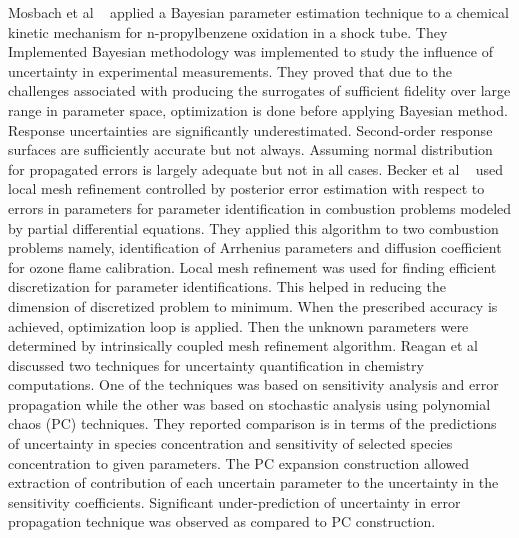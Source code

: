 Mosbach et al ~\cite{mosbac} applied a Bayesian parameter estimation technique to a chemical kinetic mechanism for n-propylbenzene oxidation in a shock tube. They Implemented Bayesian methodology was implemented to study the influence of uncertainty in experimental measurements. They proved that  due to the challenges associated with producing the surrogates of sufficient fidelity over large range in parameter space, optimization is done before applying Bayesian method. Response uncertainties are significantly underestimated. Second-order response surfaces are sufficiently accurate but not always. Assuming normal distribution for propagated errors is largely adequate but not in all cases. Becker et al ~\cite{Becker2005} used local mesh refinement controlled by posterior error estimation with respect to errors in parameters for parameter identification in combustion problems modeled by partial differential equations. They applied this algorithm to two combustion problems namely, identification of Arrhenius parameters and diffusion coefficient for ozone flame calibration. Local mesh refinement was used for finding efficient discretization for parameter identifications. This helped in reducing the dimension of discretized problem to minimum. When the prescribed accuracy is achieved, optimization loop is applied. Then the unknown parameters were determined by intrinsically coupled mesh refinement algorithm. Reagan et al ~\cite{Reagan} discussed two techniques for uncertainty quantification in chemistry computations. One of the techniques was based on sensitivity analysis and error propagation while the other was based on stochastic analysis using polynomial chaos (PC) techniques. They reported comparison is in terms of the predictions of uncertainty in species concentration and sensitivity of selected species concentration to given parameters. The PC expansion construction allowed extraction of contribution of each uncertain parameter to the uncertainty in the sensitivity coefficients. Significant under-prediction of uncertainty in error propagation technique was observed as compared to PC construction. 


